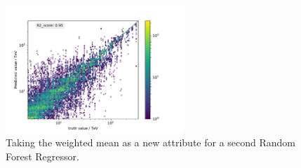 \documentclass[aspectratio=1610, professionalfonts, 9pt]{beamer}
\begin{document}
  \begin{frame}
      \begin{figure}
        \centering
        \includegraphics[width=0.6\textwidth]{Plots/RF_MSV_encaps.pdf}
        \caption{Taking the weighted mean as a new attribute for a second Random Forest Regressor.}
      \end{figure}
  \end{frame}
\end{document}
